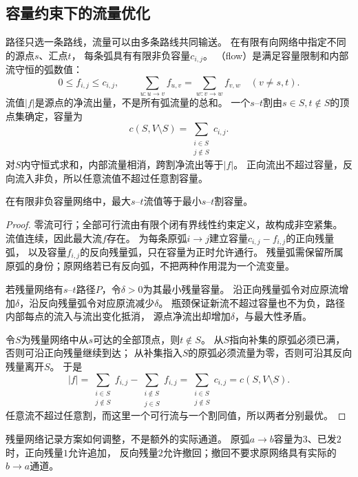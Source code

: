 \subsection{容量约束下的流量优化}

路径只选一条路线，流量可以由多条路线共同输送。
在有限有向网络中指定不同的源点\(s\)、汇点\(t\)，
每条弧具有有限非负容量\(c_{i,j}\)。
（flow）是满足容量限制和内部流守恒的弧数值：
\[
  0\leq f_{i,j}\leq c_{i,j},\qquad
  \sum_{u:u\to v}f_{u,v}
  =\sum_{w:v\to w}f_{v,w}\quad(v\neq s,t).
\]
流值\(|f|\)是源点的净流出量，不是所有弧流量的总和。
一个\(s\)--\(t\)割由\(s\in S,t\notin S\)的顶点集确定，容量为
\[
  c(S,V\setminus S)=\sum_{\substack{i\in S\\j\notin S}}c_{i,j}.
\]
对\(S\)内守恒式求和，内部流量相消，跨割净流出等于\(|f|\)。
正向流出不超过容量，反向流入非负，所以任意流值不超过任意割容量。

\begin{theorem}[最大流最小割定理]
  \label{thm:graph-theory-max-flow-min-cut}
  在有限非负容量网络中，最大\(s\)--\(t\)流值等于最小\(s\)--\(t\)割容量。
\end{theorem}

\begin{proof}
零流可行；全部可行流由有限个闭有界线性约束定义，故构成非空紧集。
流值连续，因此最大流\(f\)存在。
为每条原弧\(i\to j\)建立容量\(c_{i,j}-f_{i,j}\)的正向残量弧，
以及容量\(f_{i,j}\)的反向残量弧，只在容量为正时允许通行。
残量弧需保留所属原弧的身份；原网络若已有反向弧，不把两种作用混为一个流变量。

若残量网络有\(s\)--\(t\)路径\(P\)，令\(\delta>0\)为其最小残量容量。
沿正向残量弧令对应原流增加\(\delta\)，沿反向残量弧令对应原流减少\(\delta\)。
瓶颈保证新流不超过容量也不为负，路径内部每点的流入与流出变化抵消，
源点净流出却增加\(\delta\)，与最大性矛盾。

令\(S\)为残量网络中从\(s\)可达的全部顶点，则\(t\notin S\)。
从\(S\)指向补集的原弧必须已满，否则可沿正向残量继续到达；
从补集指入\(S\)的原弧必须流量为零，否则可沿其反向残量离开\(S\)。
于是
\[
  |f|=\sum_{\substack{i\in S\\j\notin S}}f_{i,j}
        -\sum_{\substack{i\notin S\\j\in S}}f_{i,j}
      =\sum_{\substack{i\in S\\j\notin S}}c_{i,j}
      =c(S,V\setminus S).
\]
任意流不超过任意割，而这里一个可行流与一个割同值，所以两者分别最优。
\end{proof}

残量网络记录方案如何调整，不是额外的实际通道。
原弧\(a\to b\)容量为\(3\)、已发\(2\)时，正向残量\(1\)允许追加，
反向残量\(2\)允许撤回；撤回不要求原网络具有实际的\(b\to a\)通道。

